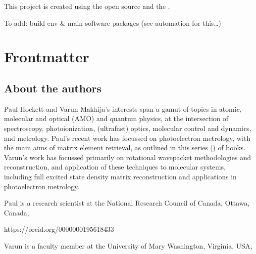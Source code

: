 \documentclass[letterpaper,table,10pt,english]{jupyterBook}
\begin{document}
\begin{DUlineblock}{0em}
\item[] 
\end{DUlineblock}

\sphinxAtStartPar
This project is created using the open source  and the .

\sphinxAtStartPar
To add: build env \& main software packages (see automation for this…)

\sphinxAtStartPar
{}

\sphinxstepscope


\part{Frontmatter}

\sphinxstepscope


\chapter{About the authors}
\label{\detokenize{frontmatter/about_the_authors:about-the-authors}}\label{\detokenize{frontmatter/about_the_authors::doc}}
\sphinxAtStartPar
Paul Hockett and Varun Makhija’s interests span a gamut of topics in atomic, molecular and optical (AMO) and quantum physics, at the intersection of spectroscopy, photoionization, (ultrafast) optics, molecular control and dynamics, and metrology. Paul’s recent work has focussed on photoelectron metrology, with the main aims of matrix element retrieval, as outlined in this series () of books. Varun’s work has focussed primarily on rotational wavepacket methodologies and reconstruction, and application of these techniques to molecular systems, including full excited state density matrix reconstruction and applications in photoelectron metrology.

\sphinxAtStartPar
Paul is a research scientist at the National Research Council of Canada, Ottawa, Canada, 

https://orcid.org/0000\sphinxhyphen{}0001\sphinxhyphen{}9561\sphinxhyphen{}8433


\sphinxAtStartPar
Varun is a faculty member at the University of Mary Washington, Virginia, USA, 
\end{document}
